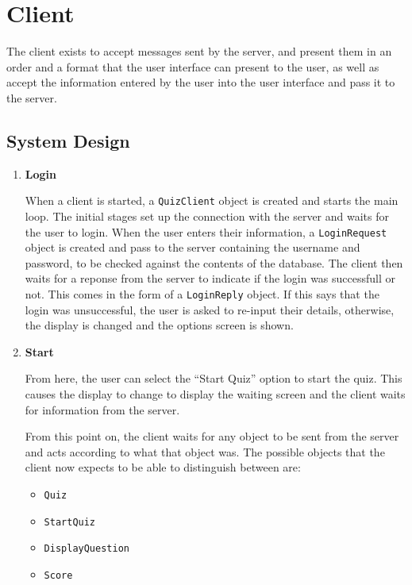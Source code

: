 \section{Client}
\label{sec:client}

The client exists to accept messages sent by the server, and present them in an
order and a format that the user interface can present to the user, as well as
accept the information entered by the user into the user interface and pass it
to the server.

\subsection{System Design}
\label{sub:client_system_design}

\begin{enumerate}

	\item \textbf{Login}

	When a client is started, a \texttt{QuizClient} object is created and
	starts the main loop.  The initial stages set up the connection with the
	server and waits for the user to login. When the user enters their
	information, a \texttt{LoginRequest} object is created and pass to the
	server containing the username and password, to be checked against the
	contents of the database. The client then waits for a reponse from the
	server to indicate if the login was successfull or not. This comes in the
	form of a \texttt{LoginReply} object. If this says that the login was
	unsuccessful, the user is asked to re-input their details, otherwise, the
	display is changed and the options screen is shown.

	\item \textbf{Start}

	From here, the user can select the ``Start Quiz'' option to start the
	quiz. This causes the display to change to display the waiting screen and
	the client waits for information from the server.

	From this point on, the client waits for any object to be sent from the
	server and acts according to what that object was. The possible objects
	that the client now expects to be able to distinguish between are:
	\begin{itemize}
		\item \texttt{Quiz}
		\item \texttt{StartQuiz}
		\item \texttt{DisplayQuestion}
		\item \texttt{Score}
	\end{itemize}


\end{enumerate}
